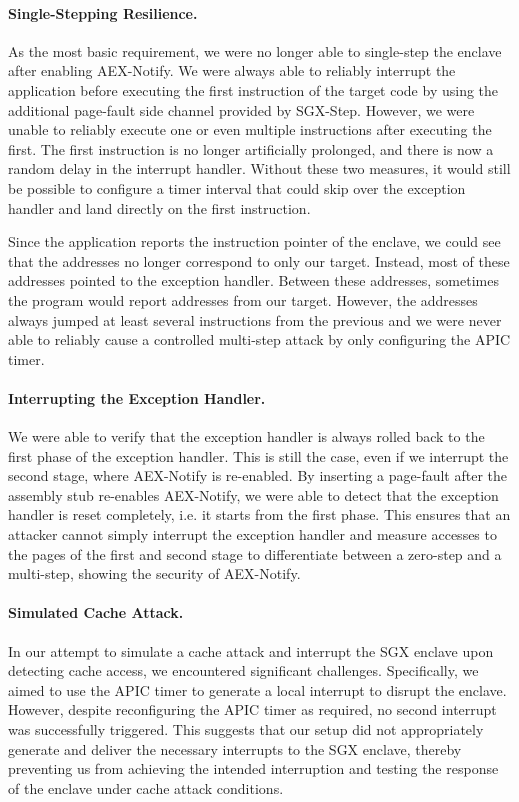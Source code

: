 \documentclass{llncs}
\begin{document}
\paragraph{Single-Stepping Resilience.}
As the most basic requirement,
we were no longer able to single-step the enclave after enabling AEX-Notify.
We were always able to reliably interrupt the application
before executing the first instruction of the target code
by using the additional page-fault side channel provided by SGX-Step.
However, we were unable to reliably execute one or
even multiple instructions after executing the first.
The first instruction is no longer artificially prolonged,
and there is now a random delay in the interrupt handler.
Without these two measures,
it would still be possible to configure a timer interval
that could skip over the exception handler and land directly on the first instruction.

Since the application reports the instruction pointer of the enclave,
we could see that the addresses no longer correspond to only our target.
Instead, most of these addresses pointed to the exception handler.
Between these addresses, sometimes the program would report addresses from our target.
However, the addresses always jumped at least several instructions from the previous
and we were never able to reliably cause a controlled multi-step attack
by only configuring the APIC timer.

\paragraph{Interrupting the Exception Handler.}
We were able to verify that the exception handler is always rolled back to the
first phase of the exception handler.
This is still the case, even if we interrupt the second stage, where AEX-Notify
is re-enabled.
By inserting a page-fault after the assembly stub re-enables AEX-Notify, we
were able to detect that the exception handler is reset completely, i.e. it
starts from the first phase.
This ensures that an attacker cannot simply interrupt the exception handler and
measure accesses to the pages of the first and second stage to differentiate
between a zero-step and a multi-step, showing the security of AEX-Notify.

\paragraph{Simulated Cache Attack.}
In our attempt to simulate a cache attack and interrupt the SGX enclave upon
detecting cache access, we encountered significant challenges.
Specifically, we aimed to use the APIC timer to generate a local interrupt to
disrupt the enclave.
However, despite reconfiguring the APIC timer as required, no second interrupt
was successfully triggered.
This suggests that our setup did not appropriately generate and deliver the
necessary interrupts to the SGX enclave, thereby preventing us from achieving
the intended interruption and testing the response of the enclave under cache
attack conditions.
\end{document}
